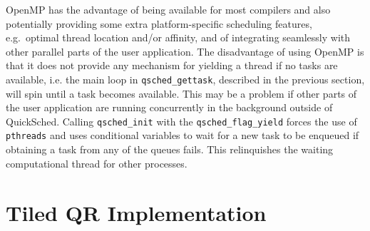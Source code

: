 \documentclass[fleqn,10pt]{wlpeerj}
\begin{document}
OpenMP has the advantage of being available for most compilers
and also potentially providing some extra platform-specific
scheduling features, e.g.~optimal thread location and/or affinity,
and of integrating seamlessly with other parallel parts of the
user application.
The disadvantage of using OpenMP is that it does not provide
any mechanism for yielding a thread if no tasks are available,
i.e. the main loop in {\tt qsched\_gettask}, described in the
previous section, will spin until a task becomes available.
This may be a problem if other parts of the user application
are running concurrently in the background outside of QuickSched.
Calling {\tt qsched\_init} with the {\tt qsched\_flag\_yield}
forces the use of {\tt pthreads} and uses conditional variables
to wait for a new task to be enqueued if obtaining a task
from any of the queues fails.
This relinquishes the waiting computational thread for other
processes.


\section{Tiled QR Implementation}
\end{document}
